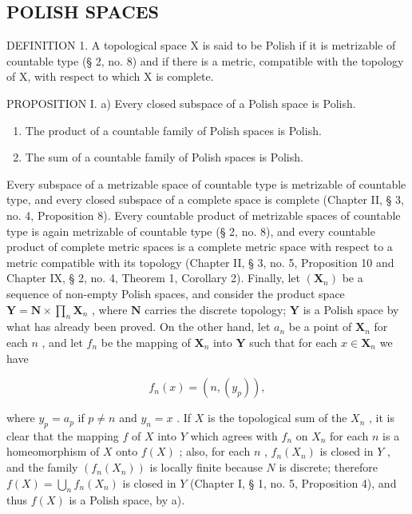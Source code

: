 \subsection{POLISH SPACES}

DEFINITION 1. A topological space X is said to be Polish if it is metrizable of countable type (§ 2, no. 8) and if there is a metric, compatible with the topology of X, with respect to which X is complete.

PROPOSITION I. a) Every closed subspace of a Polish space is Polish.

\begin{enumerate}
\def\labelenumi{\alph{enumi})}
\setcounter{enumi}{1}
\item
  The product of a countable family of Polish spaces is Polish.
\item
  The sum of a countable family of Polish spaces is Polish.
\end{enumerate}

Every subspace of a metrizable space of countable type is metrizable of countable type, and every closed subspace of a complete space is complete (Chapter II, § 3, no. 4, Proposition 8). Every countable product of metrizable spaces of countable type is again metrizable of countable type (§ 2, no. 8), and every countable product of complete metric spaces is a complete metric space with respect to a metric compatible with its topology (Chapter II, § 3, no. 5, Proposition 10 and Chapter IX, § 2, no. 4, Theorem 1, Corollary 2). Finally, let \((\mathbf{X}_n)\) be a sequence of non-empty Polish spaces, and consider the product space \(\mathbf{Y} = \mathbf{N} \times \prod_{n} \mathbf{X}_n\) , where \(\mathbf{N}\) carries the discrete topology; \(\mathbf{Y}\) is a Polish space by what has already been proved. On the other hand, let \(a_n\) be a point of \(\mathbf{X}_n\) for each \(n\) , and let \(f_n\) be the mapping of \(\mathbf{X}_n\) into \(\mathbf{Y}\) such that for each \(x \in \mathbf{X}_n\) we have

\[
f _ {n} (x) = (n, \left(y _ {p}\right)),
\]

where \(y_{p} = a_{p}\) if \(p \neq n\) and \(y_{n} = x\) . If \(X\) is the topological sum of the \(X_{n}\) , it is clear that the mapping \(f\) of \(X\) into \(Y\) which agrees with \(f_{n}\) on \(X_{n}\) for each \(n\) is a homeomorphism of \(X\) onto \(f(X)\) ; also, for each \(n\) , \(f_{n}(X_{n})\) is closed in \(Y\) , and the family \((f_{n}(X_{n}))\) is locally finite because \(N\) is discrete; therefore \(f(X) = \bigcup_{n} f_{n}(X_{n})\) is closed in \(Y\) (Chapter I, § 1, no. 5, Proposition 4), and thus \(f(X)\) is a Polish space, by a).

